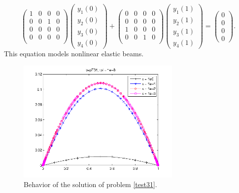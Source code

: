 \documentclass[<options>]{article}
\begin{document}
\begin{equation*}
\left(
  \begin{array}{cccc}
    1& 0 & 0 & 0\\
    0 & 0 & 1 & 0\\
    0 & 0 & 0 & 0\\
    0 & 0 & 0 & 0\\
  \end{array}
\right)
\left(\begin{array}{c}
y_{1}(0)\\
y_{2}(0)\\
y_{3}(0)\\
y_{4}(0)
\end{array}\right)
+
\left(
  \begin{array}{cccc}
    0 & 0 & 0 & 0\\
    0 & 0 & 0 & 0\\
    1 & 0 & 0 & 0\\
    0 & 0 & 1 & 0\\
  \end{array}
\right)
\left(\begin{array}{c}
y_{1}(1)\\
y_{2}(1)\\
y_{3}(1)\\
y_{4}(1)
\end{array}\right)=\left(\begin{array}{c}
0 \\
0 \\
0\\
0
\end{array}\right).
\end{equation*}
This equation models nonlinear elastic beams.

\begin{figure}[htb]
\centerline{\includegraphics[height=6cm]{Prob31}}
\caption{Behavior of the solution of problem \ref{test31}.}
\end{figure}
\newpage
\end{document}
